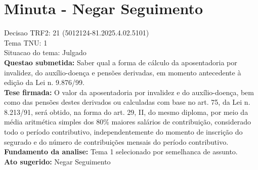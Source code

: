 \documentclass{article}
\begin{document}
\section*{Minuta - Negar Seguimento}
Decisao TRF2: 21 (5012124-81.2025.4.02.5101)\\
Tema TNU: 1\\
Situacao do tema: Julgado\\
\textbf{Questao submetida:} Saber qual a forma de cálculo da aposentadoria por invalidez, do auxílio-doença e pensões derivadas, em momento antecedente à edição da Lei n. 9.876/99.\\
\textbf{Tese firmada:} O valor da aposentadoria por invalidez e do auxílio-doença, bem como das pensões destes derivados ou calculadas com base no art. 75, da Lei n. 8.213/91, será obtido, na forma do art. 29, II, do mesmo diploma, por meio da média aritmética simples dos 80\% maiores salários de contribuição, considerado todo o período contributivo, independentemente do momento de inscrição do segurado e do número de contribuições mensais do período contributivo.\\
\textbf{Fundamento da analise:} Tema 1 selecionado por semelhanca de assunto.\\
\textbf{Ato sugerido:} Negar Seguimento
\end{document}
